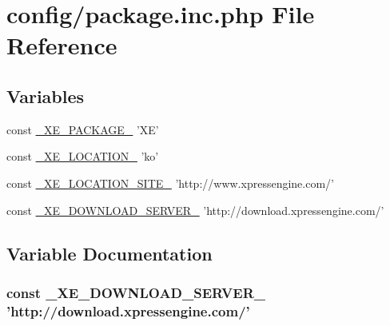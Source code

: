 \hypertarget{package_8inc_8php}{\section{config/package.inc.\+php File Reference}
\label{package_8inc_8php}
}
\subsection*{Variables}
\begin{DoxyCompactItemize}
\item 
const \hyperlink{package_8inc_8php_ac4384cdc784342cd44d75952334decb4}{\+\_\+\+X\+E\+\_\+\+P\+A\+C\+K\+A\+G\+E\+\_\+} 'X\+E'
\item 
const \hyperlink{package_8inc_8php_a7330debbfb3a027cdd5f3d3dd1dfbdd0}{\+\_\+\+X\+E\+\_\+\+L\+O\+C\+A\+T\+I\+O\+N\+\_\+} 'ko'
\item 
const \hyperlink{package_8inc_8php_a063bfd2eb9f811b1676d0dbc0cad2648}{\+\_\+\+X\+E\+\_\+\+L\+O\+C\+A\+T\+I\+O\+N\+\_\+\+S\+I\+T\+E\+\_\+} 'http\+://www.\+xpressengine.\+com/'
\item 
const \hyperlink{package_8inc_8php_a22df32d3e0eae0d60d6cddb9ec99d5ec}{\+\_\+\+X\+E\+\_\+\+D\+O\+W\+N\+L\+O\+A\+D\+\_\+\+S\+E\+R\+V\+E\+R\+\_\+} 'http\+://download.\+xpressengine.\+com/'
\end{DoxyCompactItemize}


\subsection{Variable Documentation}
\hypertarget{package_8inc_8php_a22df32d3e0eae0d60d6cddb9ec99d5ec}{
\subsubsection[{\+\_\+\+X\+E\+\_\+\+D\+O\+W\+N\+L\+O\+A\+D\+\_\+\+S\+E\+R\+V\+E\+R\+\_\+}]{\setlength{\rightskip}{0pt plus 5cm}const \+\_\+\+X\+E\+\_\+\+D\+O\+W\+N\+L\+O\+A\+D\+\_\+\+S\+E\+R\+V\+E\+R\+\_\+ 'http\+://download.\+xpressengine.\+com/'}}\label{package_8inc_8php_a22df32d3e0eae0d60d6cddb9ec99d5ec}


